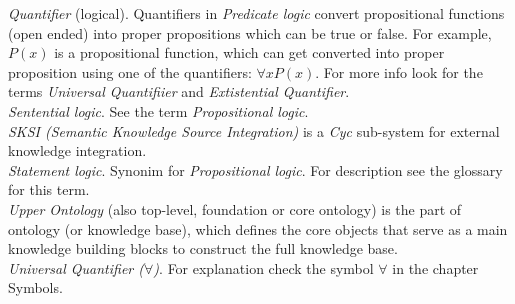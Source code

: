 \emph{Quantifier} (logical). Quantifiers in \emph{Predicate logic} convert
propositional functions (open ended) into proper propositions which can be true
or false. For example, $P(x)$ is a propositional function, which can get
converted into proper proposition using one of the quantifiers: 
$\forall x P(x)$. For more info look for the terms \emph{Universal Quantifiier}
and \emph{Extistential Quantifier}.\\

\emph{Sentential logic}. See the term \emph{Propositional logic}.\\

\emph{SKSI (Semantic Knowledge Source Integration)} is a \emph{Cyc} sub-system
for external knowledge integration.\\

\emph{Statement logic}. Synonim for \emph{Propositional logic}. For description
see the glossary for this term.\\

\emph{Upper Ontology} (also top-level, foundation or core ontology) is the part
of ontology (or knowledge base), which defines the core objects that serve as a
main knowledge building blocks to construct the full knowledge base.\\

\emph{Universal Quantifier ($\forall$)}. For explanation check the symbol 
$\forall$ in the chapter Symbols. \\
